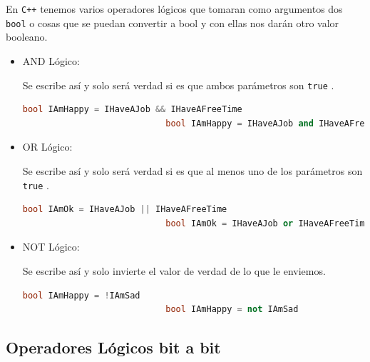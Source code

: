\documentclass[12pt, fleqn]{report}                             %
\theoremstyle{break}                                            %
\newcommand{\textCode}[1]  { \texttt{#1} }                      %
\newcommand{\Cpp}{\ignorespaces\textCode{C++}}                  %
\begin{document}
                En \Cpp tenemos varios operadores lógicos que tomaran como argumentos dos 
                \textCode{bool} o cosas que se puedan convertir a bool y con ellas nos darán otro
                valor booleano.

                \begin{itemize}
                    \item AND Lógico: 
                    
                        Se escribe así y solo será verdad si es que ambos parámetros son \textCode{true}.
                        \begin{lstlisting}[language=C++, gobble=28]
                            bool IAmHappy = IHaveAJob && IHaveAFreeTime 
                            bool IAmHappy = IHaveAJob and IHaveAFreeTime
                        \end{lstlisting}

                    \item OR Lógico: 
                    
                        Se escribe así y solo será verdad si es que al menos uno de los parámetros son \textCode{true}.
                        \begin{lstlisting}[language=C++, gobble=28]
                            bool IAmOk = IHaveAJob || IHaveAFreeTime 
                            bool IAmOk = IHaveAJob or IHaveAFreeTime
                        \end{lstlisting}

                    \item NOT Lógico: 
                    
                        Se escribe así y solo invierte el valor de verdad de lo que le enviemos.
                        \begin{lstlisting}[language=C++, gobble=28]
                            bool IAmHappy = !IAmSad
                            bool IAmHappy = not IAmSad
                        \end{lstlisting}

                \end{itemize}


            \subsection{Operadores Lógicos bit a bit}
\end{document}
